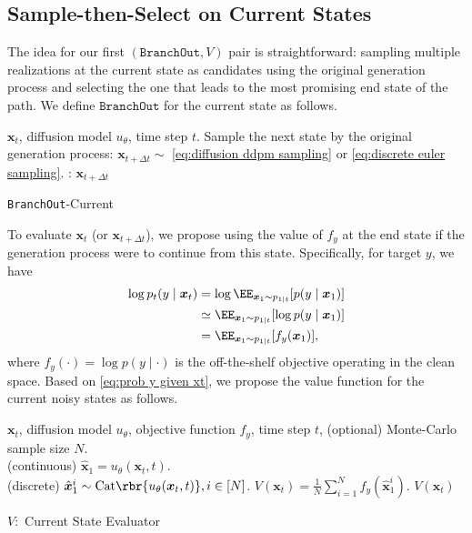 \subsection{Sample-then-Select on Current States}
\label{subsec:xtsampling}

The idea for our first $(\texttt{BranchOut}, V)$ pair is straightforward: sampling multiple realizations at the current state as candidates using the original generation process and selecting the one that leads to the most promising end state of the path. We define $\texttt{BranchOut}$ for the current state as follows. 

\begin{module}[htb]
\begin{algorithmic}[1]
 $\boldsymbol{x}_t$, diffusion model $u_\theta$, time step $t$.
\STATE Sample the next state by the original generation process:
$\boldsymbol{x}_{t + \Delta t} \sim$ \eqref{eq:diffusion ddpm sampling} or \eqref{eq:discrete euler sampling}.
: { $\boldsymbol{x}_{t + \Delta t}$}
\end{algorithmic}
\caption{\texttt{BranchOut}-Current}
\label{mol:xt_sampling}
\end{module}
\vspace{-5pt}

To evaluate $\boldsymbol{x}_{t}$ (or $ \boldsymbol{x}_{t+\Delta t}$), we propose using the value of $f_y$ at the end state if the generation process were to continue from this state. Specifically, for target $y$, we have
\begin{equation}\label{eq:prob y given xt}
\begin{aligned}
    \log p_t(y \mid \boldsymbol{x}_t) &= \log \EE_{\boldsymbol{x}_1 \sim p_{1|t} }[p(y\mid \boldsymbol{x}_1)] \\
    &\simeq \EE_{\boldsymbol{x}_1 \sim p_{1|t} } [\log p(y\mid \boldsymbol{x}_1)] \\
    &= \EE_{\boldsymbol{x}_1 \sim p_{1|t} } [f_y(\boldsymbol{x}_1)],
\end{aligned}
\end{equation}
where $f_y(\cdot) = \log p(y\mid \cdot)$ is the off-the-shelf objective operating in the clean space. Based on \eqref{eq:prob y given xt}, we propose the value function for the current noisy states as follows.


\begin{vfunction}[htb]
\begin{algorithmic}[1]
 $\boldsymbol{x}_t$, diffusion model $u_\theta$, objective function $f_y$, time step $t$, (optional) Monte-Carlo sample size $N$.
\\
\quad (continuous) $\hat{\boldsymbol{x}}_1 = u_\theta(\boldsymbol{x}_t, t)$.\\
\quad (discrete) $\hat{\boldsymbol{x}}_1^i \sim \text{Cat} \rbr{u_\theta( \boldsymbol{x}_{t}, t)}, i \in [N]$.
 $V(\boldsymbol{x}_t) = \frac{1}{N}\sum_{i=1}^N f_y({\hat{\boldsymbol{x}}_1^{i}})$.
 { $V(\boldsymbol{x}_t)$}
\end{algorithmic}
\caption{$V:$ Current State Evaluator}
\label{vfunc:noisy}
\end{vfunction}

